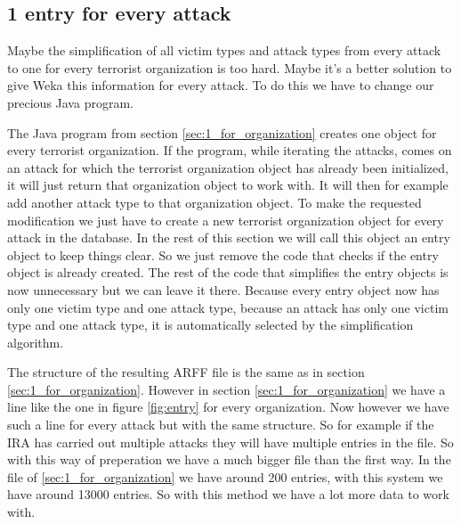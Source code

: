 \documentclass[a4]{article}
\begin{document}
\subsection{1 entry for every attack}
\label{sec:1_for_attack}
Maybe the simplification of all victim types and attack types from every attack to one for every terrorist organization is too hard. Maybe it's a better solution to give Weka this information for every attack. To do this we have to change our precious Java program.\par
The Java program from section \ref{sec:1_for_organization} creates one object for every terrorist organization. If the program, while iterating the attacks, comes on an attack for which the terrorist organization object has already been initialized, it will just return that organization object to work with. It will then for example add another attack type to that organization object. To make the requested modification we just have to create a new terrorist organization object for every attack in the database. In the rest of this section we will call this object an entry object to keep things clear. So we just remove the code that checks if the entry object is already created. The rest of the code that simplifies the entry objects is now unnecessary but we can leave it there. Because every entry object now has only one victim type and one attack type, because an attack has only one victim type and one attack type, it is automatically selected by the simplification algorithm.\par
The structure of the resulting ARFF file is the same as in section \ref{sec:1_for_organization}. However in section  \ref{sec:1_for_organization} we have a line like the one in figure \ref{fig:entry} for every organization. Now however we have such a line for every attack but with the same structure. So for example if the IRA has carried out multiple attacks they will have multiple entries in the file. So with this way of preperation we have a much bigger file than the first way. In the file of \ref{sec:1_for_organization} we have around 200 entries, with this system we have around 13000 entries. So with this method we have a lot more data to work with.
\end{document}
